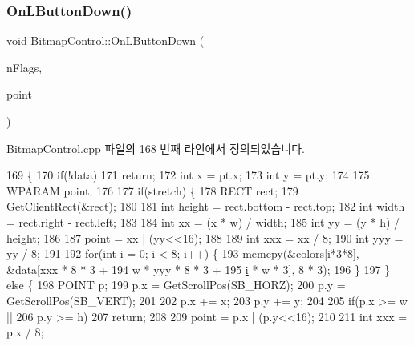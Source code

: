 \subsubsection{\texorpdfstring{On\+L\+Button\+Down()}{OnLButtonDown()}}
{\footnotesize\ttfamily void Bitmap\+Control\+::\+On\+L\+Button\+Down (\begin{DoxyParamCaption}\item[{U\+I\+NT}]{n\+Flags,  }\item[{C\+Point}]{point }\end{DoxyParamCaption})\hspace{0.3cm}{\ttfamily [protected]}}



Bitmap\+Control.\+cpp 파일의 168 번째 라인에서 정의되었습니다.


\begin{DoxyCode}
169 \{
170   \textcolor{keywordflow}{if}(!data)
171     \textcolor{keywordflow}{return};
172   \textcolor{keywordtype}{int} x = pt.x;
173   \textcolor{keywordtype}{int} y = pt.y;
174 
175   WPARAM point;
176   
177   \textcolor{keywordflow}{if}(stretch) \{
178     RECT rect;
179     GetClientRect(&rect);
180   
181     \textcolor{keywordtype}{int} height = rect.bottom - rect.top;
182     \textcolor{keywordtype}{int} width = rect.right - rect.left;
183   
184     \textcolor{keywordtype}{int} xx = (x * w) / width;
185     \textcolor{keywordtype}{int} yy = (y * h) / height;
186 
187     point = xx | (yy<<16);
188 
189     \textcolor{keywordtype}{int} xxx = xx / 8;
190     \textcolor{keywordtype}{int} yyy = yy / 8;
191 
192     \textcolor{keywordflow}{for}(\textcolor{keywordtype}{int} \mbox{\hyperlink{expr-lex_8cpp_acb559820d9ca11295b4500f179ef6392}{i}} = 0; \mbox{\hyperlink{expr-lex_8cpp_acb559820d9ca11295b4500f179ef6392}{i}} < 8; \mbox{\hyperlink{expr-lex_8cpp_acb559820d9ca11295b4500f179ef6392}{i}}++) \{
193       memcpy(&colors[\mbox{\hyperlink{expr-lex_8cpp_acb559820d9ca11295b4500f179ef6392}{i}}*3*8], &data[xxx * 8 * 3 +
194                                    w * yyy * 8 * 3 +
195                                    \mbox{\hyperlink{expr-lex_8cpp_acb559820d9ca11295b4500f179ef6392}{i}} * w * 3], 8 * 3);
196     \}
197   \} \textcolor{keywordflow}{else} \{
198     POINT p;
199     p.x = GetScrollPos(SB\_HORZ);
200     p.y = GetScrollPos(SB\_VERT);
201 
202     p.x += x;
203     p.y += y;
204 
205     \textcolor{keywordflow}{if}(p.x >= w ||
206        p.y >= h)
207       \textcolor{keywordflow}{return};
208 
209     point = p.x | (p.y<<16);
210     
211     \textcolor{keywordtype}{int} xxx = p.x / 8;

\end{DoxyCode}
